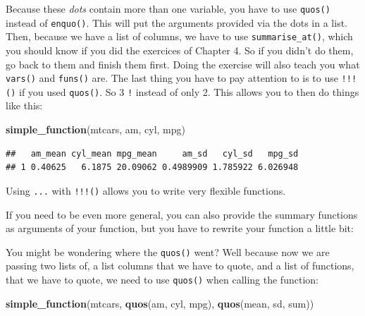 \documentclass[]{gitbook}
\newenvironment{Shaded}{\begin{snugshade}}{\end{snugshade}}
\newcommand{\ControlFlowTok}[1]{\textcolor[rgb]{0.13,0.29,0.53}{\textbf{#1}}}
\newcommand{\KeywordTok}[1]{\textcolor[rgb]{0.13,0.29,0.53}{\textbf{#1}}}
\newcommand{\NormalTok}[1]{#1}
\newcommand{\OperatorTok}[1]{\textcolor[rgb]{0.81,0.36,0.00}{\textbf{#1}}}
\newcommand{\StringTok}[1]{\textcolor[rgb]{0.31,0.60,0.02}{#1}}
\begin{document}
Because these \emph{dots} contain more than one variable, you have to use \texttt{quos()} instead of \texttt{enquo()}.
This will put the arguments provided via the dots in a list. Then, because we have a list of
columns, we have to use \texttt{summarise\_at()}, which you should know if you did the exercices of
Chapter 4. So if you didn't do them, go back to them and finish them first. Doing the exercise will
also teach you what \texttt{vars()} and \texttt{funs()} are. The last thing you have to pay attention to is to
use \texttt{!!!()} if you used \texttt{quos()}. So 3 \texttt{!} instead of only 2. This allows you to then do things
like this:

\begin{Shaded}
\begin{Highlighting}[]
\KeywordTok{simple_function}\NormalTok{(mtcars, am, cyl, mpg)}
\end{Highlighting}
\end{Shaded}

\begin{verbatim}
##   am_mean cyl_mean mpg_mean     am_sd   cyl_sd   mpg_sd
## 1 0.40625   6.1875 20.09062 0.4989909 1.785922 6.026948
\end{verbatim}

Using \texttt{...} with \texttt{!!!()} allows you to write very flexible functions.

If you need to be even more general, you can also provide the summary functions as arguments of
your function, but you have to rewrite your function a little bit:

\begin{Shaded}
\end{Shaded}

You might be wondering where the \texttt{quos()} went? Well because now we are passing two lists of, a list
columns that we have to quote, and a list of functions, that we have to quote, we need to use \texttt{quos()}
when calling the function:

\begin{Shaded}
\begin{Highlighting}[]
\KeywordTok{simple_function}\NormalTok{(mtcars, }\KeywordTok{quos}\NormalTok{(am, cyl, mpg), }\KeywordTok{quos}\NormalTok{(mean, sd, sum))}
\end{Highlighting}
\end{Shaded}
\end{document}
